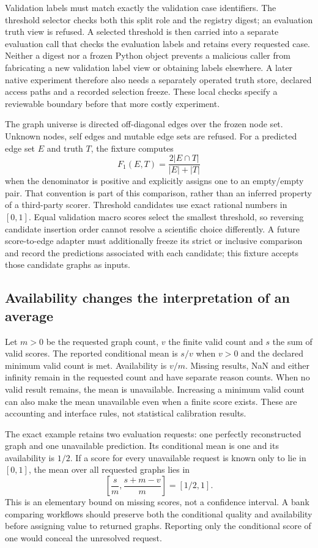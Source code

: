 Validation labels must match exactly the validation case identifiers. The threshold
selector checks both this split role and the registry digest; an evaluation truth
view is refused. A selected threshold is then carried into a separate evaluation
call that checks the evaluation labels and retains every requested case. Neither
a digest nor a frozen Python object prevents a malicious caller from fabricating
a new validation label view or obtaining labels elsewhere. A later native
experiment therefore also needs a separately operated truth store, declared
access paths and a recorded selection freeze. These local checks specify a
reviewable boundary before that more costly experiment.
\citep{exec28_fj_contract}

The graph universe is directed off-diagonal edges over the frozen node set.
Unknown nodes, self edges and mutable edge sets are refused. For a predicted
edge set $E$ and truth $T$, the fixture computes
\[
 F_1(E,T)=\frac{2|E\cap T|}{|E|+|T|}
\]
when the denominator is positive and explicitly assigns one to an empty/empty
pair. That convention is part of this comparison, rather than an inferred
property of a third-party scorer. Threshold candidates use exact rational
numbers in $[0,1]$. Equal validation macro scores select the smallest threshold,
so reversing candidate insertion order cannot resolve a scientific choice
differently. A future score-to-edge adapter must additionally freeze its strict
or inclusive comparison and record the predictions associated with each
candidate; this fixture accepts those candidate graphs as inputs.
\citep{exec28_fj_contract}

\subsection{Availability changes the interpretation of an average}
Let $m>0$ be the requested graph count, $v$ the finite valid count and $s$ the sum
of valid scores. The reported conditional mean is $s/v$ when $v>0$ and the declared
minimum valid count is met. Availability is $v/m$. Missing results, NaN and
either infinity remain in the requested count and have separate reason counts.
When no valid result remains, the mean is unavailable. Increasing a minimum
valid count can also make the mean unavailable even when a finite score exists.
These are accounting and interface rules, not statistical calibration results.
\citep{exec28_fj_contract}

The exact example retains two evaluation requests: one perfectly reconstructed
graph and one unavailable prediction. Its conditional mean is one and its
availability is $1/2$. If a score for every unavailable request is known only
to lie in $[0,1]$, the mean over all requested graphs lies in
\[
 \left[\frac{s}{m},\frac{s+m-v}{m}\right]=[1/2,1].
\]
This is an elementary bound on missing scores, not a confidence interval.
A bank comparing workflows should preserve both the conditional quality and
availability before assigning value to returned graphs. Reporting only the
conditional score of one would conceal the unresolved request.
\citep{exec28_fj_reference}

